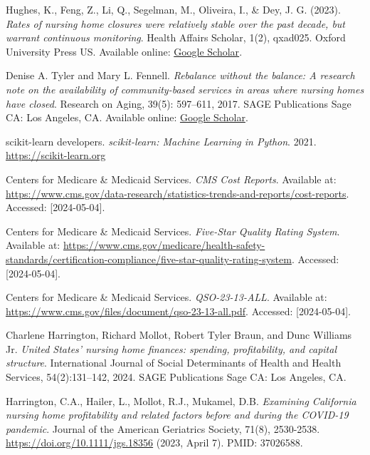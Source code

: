 \documentclass{article}
\theoremstyle{mytheoremstyle}
\theoremstyle{mytheoremstyle}
\theoremstyle{myproblemstyle}
\begin{document}
\begin{thebibliography}{9}

Hughes, K., Feng, Z., Li, Q., Segelman, M., Oliveira, I., \& Dey, J. G. (2023).
\textit{Rates of nursing home closures were relatively stable over the past decade, but warrant continuous monitoring}.
Health Affairs Scholar, 1(2), qxad025. Oxford University Press US. Available online: \href{https://scholar.google.com/scholar_lookup?journal=Heal+Aff+Sch&title=Rates+of+nursing+home+closures+were+relatively+stable+over+the+past+decade,+but+warrant+continuous+monitoring&author=K+Hughes&author=Z+Feng&author=Q+Li&volume=1&issue=2&publication_year=2023&d=gs_cit&t=1714807740518&u=%2Fscholar%3Fq%3Dinfo%3AT6cB2hNX4sgJ%3Ascholar.google.com%2F%26output%3Dcite%26scirp%3D0%26hl%3Den}{Google Scholar}.

Denise A. Tyler and Mary L. Fennell.
\textit{Rebalance without the balance: A research note on the availability of community-based services in areas where nursing homes have closed}.
Research on Aging, 39(5): 597--611, 2017.
SAGE Publications Sage CA: Los Angeles, CA. Available online: \href{https://scholar.google.com/scholar_lookup?journal=Heal+Aff+Sch&title=Rates+of+nursing+home+closures+were+relatively+stable+over+the+past+decade,+but+warrant+continuous+monitoring&author=K+Hughes&author=Z+Feng&author=Q+Li&volume=1&issue=2&publication_year=2023&}{Google Scholar}.

scikit-learn developers. 
\textit{scikit-learn: Machine Learning in Python}. 
2021. 
\url{https://scikit-learn.org}

Centers for Medicare \& Medicaid Services.
\textit{CMS Cost Reports}. 
Available at: \url{https://www.cms.gov/data-research/statistics-trends-and-reports/cost-reports}.
Accessed: [2024-05-04].

Centers for Medicare \& Medicaid Services.
\textit{Five-Star Quality Rating System}. 
Available at: \url{https://www.cms.gov/medicare/health-safety-standards/certification-compliance/five-star-quality-rating-system}.
Accessed: [2024-05-04].

Centers for Medicare \& Medicaid Services.
\textit{QSO-23-13-ALL}. 
Available at: \url{https://www.cms.gov/files/document/qso-23-13-all.pdf}.
Accessed: [2024-05-04].

Charlene Harrington, Richard Mollot, Robert Tyler Braun, and Dunc Williams Jr.
\textit{United States' nursing home finances: spending, profitability, and capital structure}.
International Journal of Social Determinants of Health and Health Services, 54(2):131--142, 2024.
SAGE Publications Sage CA: Los Angeles, CA.

Harrington, C.A., Hailer, L., Mollot, R.J., Mukamel, D.B. 
\textit{Examining California nursing home profitability and related factors before and during the COVID-19 pandemic}.
Journal of the American Geriatrics Society, 71(8), 2530-2538. 
\url{https://doi.org/10.1111/jgs.18356} (2023, April 7). PMID: 37026588.


\end{thebibliography}


\end{document}
